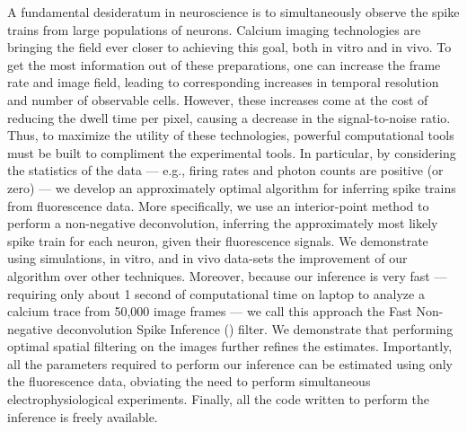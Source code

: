 
A fundamental desideratum in neuroscience is to simultaneously observe the spike trains from large populations of neurons. Calcium imaging technologies are bringing the field ever closer to achieving this goal, both in vitro and in vivo. To get the most information out of these preparations, one can increase the frame rate and image field, leading to corresponding increases in temporal resolution and number of observable cells.  However, these increases come at the cost of reducing the dwell time per pixel, causing a decrease in the signal-to-noise ratio.  Thus, to maximize the utility of these technologies, powerful computational tools must be built to compliment the experimental tools.  In particular, by considering the statistics of the data --- e.g., firing rates and photon counts are positive (or zero) --- we develop an approximately optimal algorithm for inferring spike trains from fluorescence data. More specifically, we use an interior-point method to perform a non-negative deconvolution, inferring the approximately most likely spike train for each neuron, given their fluorescence signals. We demonstrate using simulations, in vitro, and in vivo data-sets the improvement of our algorithm over other techniques.  Moreover, because our inference is very fast --- requiring only about 1 second of computational time on laptop to analyze a calcium trace from 50,000 image frames --- we call this approach the Fast Non-negative deconvolution Spike Inference (\foopsi) filter. We demonstrate that performing optimal spatial filtering on the images further refines the estimates.  Importantly, all the parameters required to perform our inference can be estimated using only the fluorescence data, obviating the need to perform simultaneous electrophysiological experiments.  Finally, all the code written to perform the inference is freely available.


